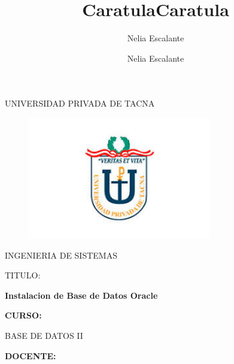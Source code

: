 \documentclass[12pt,letterpaper]{article}
\author{Nelia Escalante}
\title{Caratula}
\begin{document}
\author{Nelia Escalante}
\title{Caratula}

\begin{titlepage}
\begin{center}
\large{UNIVERSIDAD PRIVADA DE TACNA}\\
\vspace*{-0.025in}
\begin{figure}[htb]
\begin{center}
\includegraphics[width=8cm]{./IMG/logo}
\end{center}
\end{figure}
\vspace*{0.15in}
INGENIERIA DE SISTEMAS  \\

\vspace*{0.5in}
\begin{large}
TITULO:\\
\end{large}

\vspace*{0.1in}
\begin{Large}
\textbf{Instalacion de Base de Datos Oracle} \\
\end{Large}

\vspace*{0.3in}
\begin{Large}
\textbf{CURSO:} \\
\end{Large}

\vspace*{0.1in}
\begin{large}
BASE DE DATOS II\\
\end{large}

\vspace*{0.3in}
\begin{Large}
\textbf{DOCENTE:} \\
\end{Large}


\end{center}
\end{titlepage}
\end{document}
